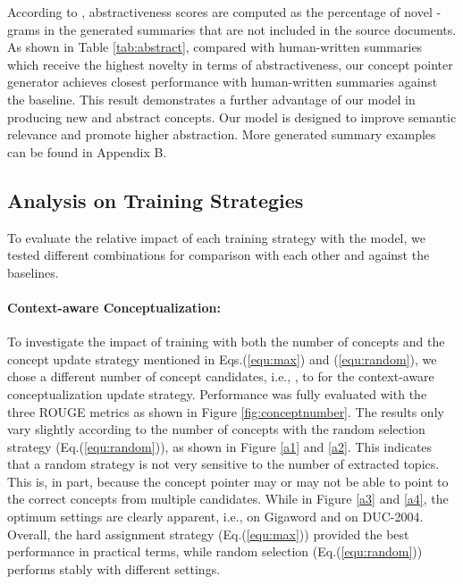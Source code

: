 \documentclass[11pt,a4paper]{article}
\begin{document}
 According to \citet{chen2018fast}, abstractiveness scores are  computed as the  percentage of novel -grams in the  generated summaries that are not included in the source documents. As shown in Table \ref{tab:abstract}, compared with human-written summaries which receive the highest novelty in terms of abstractiveness, our concept pointer generator achieves closest  performance with human-written summaries against the baseline. This result demonstrates a further advantage of our model in producing new and abstract concepts. 
Our model is designed to improve semantic relevance and promote  higher abstraction. More generated summary examples can be found in Appendix B.

\subsection{Analysis on Training Strategies}

To evaluate the relative impact of each training strategy with the model, we tested different combinations for comparison with each other and against the baselines. 

\paragraph{Context-aware Conceptualization:}
To investigate the impact of training with both the number of concepts  and the concept update strategy mentioned in  Eqs.(\ref{equ:max}) and (\ref{equ:random}), we chose a different number of concept candidates, i.e., , to for the context-aware conceptualization update strategy. Performance was fully evaluated with the three ROUGE metrics as shown in Figure  \ref{fig:conceptnumber}. 
The results only vary slightly according to the number of concepts with the random selection strategy (Eq.(\ref{equ:random})), as shown in Figure \ref{a1} and \ref{a2}. This indicates that a random strategy is not very sensitive to the number of extracted topics.  This is, in part, because the concept pointer may or may not be able to point to the correct concepts from multiple candidates.
While in Figure \ref{a3} and \ref{a4}, the optimum settings are clearly apparent, i.e.,  on Gigaword and  on DUC-2004.  
Overall, the hard assignment strategy (Eq.(\ref{equ:max})) provided the best performance in practical terms, while random selection (Eq.(\ref{equ:random})) performs stably with different settings. 
\end{document}

